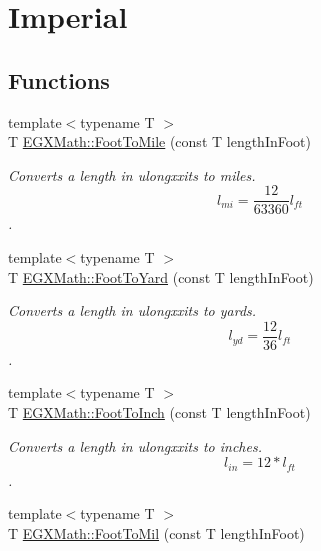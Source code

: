 \hypertarget{group___e_g_x_math-_conversions-_length_conversions-_imperial-_foot-_imperial}{}\section{Imperial}
\label{group___e_g_x_math-_conversions-_length_conversions-_imperial-_foot-_imperial}
\subsection*{Functions}
\begin{DoxyCompactItemize}
\item 
{\footnotesize template$<$typename T $>$ }\\T \mbox{\hyperlink{group___e_g_x_math-_conversions-_length_conversions-_imperial-_foot-_imperial_gae582c3dbb801f710a44fe2eec4af1309}{E\+G\+X\+Math\+::\+Foot\+To\+Mile}} (const T length\+In\+Foot)
\begin{DoxyCompactList}\small\item\em Converts a length in ulongxxits to miles. \[ l_{mi}=\frac{12}{63360} l_{ft} \]. \end{DoxyCompactList}\item 
{\footnotesize template$<$typename T $>$ }\\T \mbox{\hyperlink{group___e_g_x_math-_conversions-_length_conversions-_imperial-_foot-_imperial_ga19dfde4f9f3e82791f94c713ee3ee2ad}{E\+G\+X\+Math\+::\+Foot\+To\+Yard}} (const T length\+In\+Foot)
\begin{DoxyCompactList}\small\item\em Converts a length in ulongxxits to yards. \[ l_{yd}= \frac{12}{36} l_{ft} \]. \end{DoxyCompactList}\item 
{\footnotesize template$<$typename T $>$ }\\T \mbox{\hyperlink{group___e_g_x_math-_conversions-_length_conversions-_imperial-_foot-_imperial_ga2018d690827394d8a88e1a0d046f8e8d}{E\+G\+X\+Math\+::\+Foot\+To\+Inch}} (const T length\+In\+Foot)
\begin{DoxyCompactList}\small\item\em Converts a length in ulongxxits to inches. \[ l_{in}=12 * l_{ft} \]. \end{DoxyCompactList}\item 
{\footnotesize template$<$typename T $>$ }\\T \mbox{\hyperlink{group___e_g_x_math-_conversions-_length_conversions-_imperial-_foot-_imperial_gab25e7780b3c0429c1a05eafbcbe322a5}{E\+G\+X\+Math\+::\+Foot\+To\+Mil}} (const T length\+In\+Foot)

\end{DoxyCompactItemize}
